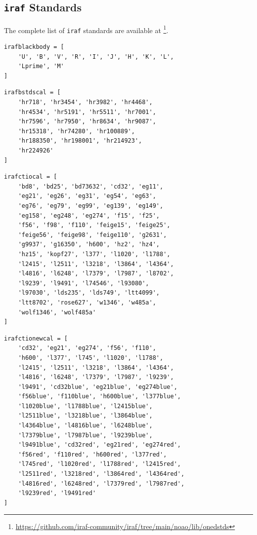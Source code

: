 \documentclass[fleqn,usenatbib]{mnras}
\begin{document}
\subsection{\texttt{iraf} Standards}
The complete list of \texttt{iraf} standards are available at
\footnote{\url{https://github.com/iraf-community/iraf/tree/main/noao/lib/onedstds}}.

\begin{verbatim}
irafblackbody = [
    'U', 'B', 'V', 'R', 'I', 'J', 'H', 'K', 'L',
    'Lprime', 'M'
]
\end{verbatim}

\begin{verbatim}
irafbstdscal = [
    'hr718', 'hr3454', 'hr3982', 'hr4468',
    'hr4534', 'hr5191', 'hr5511', 'hr7001',
    'hr7596', 'hr7950', 'hr8634', 'hr9087',
    'hr15318', 'hr74280', 'hr100889',
    'hr188350', 'hr198001', 'hr214923',
    'hr224926'
]
\end{verbatim}

\begin{verbatim}
irafctiocal = [
    'bd8', 'bd25', 'bd73632', 'cd32', 'eg11',
    'eg21', 'eg26', 'eg31', 'eg54', 'eg63',
    'eg76', 'eg79', 'eg99', 'eg139', 'eg149',
    'eg158', 'eg248', 'eg274', 'f15', 'f25',
    'f56', 'f98', 'f110', 'feige15', 'feige25',
    'feige56', 'feige98', 'feige110', 'g2631',
    'g9937', 'g16350', 'h600', 'hz2', 'hz4',
    'hz15', 'kopf27', 'l377', 'l1020', 'l1788',
    'l2415', 'l2511', 'l3218', 'l3864', 'l4364',
    'l4816', 'l6248', 'l7379', 'l7987', 'l8702',
    'l9239', 'l9491', 'l74546', 'l93080',
    'l97030', 'lds235', 'lds749', 'ltt4099',
    'ltt8702', 'rose627', 'w1346', 'w485a',
    'wolf1346', 'wolf485a'
]
\end{verbatim}

\begin{verbatim}
irafctionewcal = [
    'cd32', 'eg21', 'eg274', 'f56', 'f110',
    'h600', 'l377', 'l745', 'l1020', 'l1788',
    'l2415', 'l2511', 'l3218', 'l3864', 'l4364',
    'l4816', 'l6248', 'l7379', 'l7987', 'l9239',
    'l9491', 'cd32blue', 'eg21blue', 'eg274blue',
    'f56blue', 'f110blue', 'h600blue', 'l377blue',
    'l1020blue', 'l1788blue', 'l2415blue',
    'l2511blue', 'l3218blue', 'l3864blue',
    'l4364blue', 'l4816blue', 'l6248blue',
    'l7379blue', 'l7987blue', 'l9239blue',
    'l9491blue', 'cd32red', 'eg21red', 'eg274red',
    'f56red', 'f110red', 'h600red', 'l377red',
    'l745red', 'l1020red', 'l1788red', 'l2415red',
    'l2511red', 'l3218red', 'l3864red', 'l4364red',
    'l4816red', 'l6248red', 'l7379red', 'l7987red',
    'l9239red', 'l9491red'
]
\end{verbatim}
\end{document}
